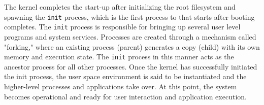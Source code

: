 The kernel completes the start-up after initializing the root filesystem and spawning the \texttt{init} process, which is the first process to that starts after booting completes. The \texttt{init} process is responsible for bringing up several user level programs and system services. Processes are created through a mechanism called "forking," where an existing process (parent) generates a copy (child) with its own memory and execution state. The \texttt{init} process in this manner acts as the ancestor process for all other processes. Once the kernel has successfully initiated the init process, the user space environment is said to be instantiated and the higher-level processes and applications take over. At this point, the system becomes operational and ready for user interaction and application execution.
